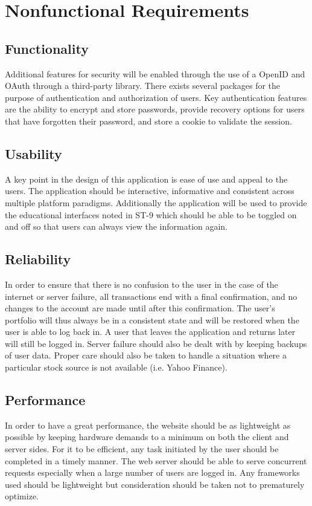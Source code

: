 \section{Nonfunctional Requirements}

\subsection{Functionality}
Additional features for security will be enabled through the use of a
OpenID and OAuth through a third-party library. There exists several packages
for the purpose of authentication and authorization of users. Key authentication
features are the ability to encrypt and store passwords, provide recovery
options for users that have forgotten their password, and store a cookie to
validate the session.


\subsection{Usability}
A key point in the design of this application is ease of use and appeal to the
users. The application should be interactive, informative and consistent across
multiple platform paradigms. Additionally the application will be used to
provide the educational interfaces noted in ST-9 which should be able to be
toggled on and off so that users can always view the information again.


\subsection{Reliability}
In order to ensure that there is no confusion to the user in the case of the
internet or server failure, all transactions end with a final confirmation, and
no changes to the account are made until after this confirmation. The user's
portfolio will thus always be in a consistent state and will be restored when
the user is able to log back in. A user that leaves the application and returns
later will still be logged in. Server failure should also be dealt with by
keeping backups of user data.  Proper care should also be taken to handle a
situation where a particular stock source is not available (i.e. Yahoo Finance).


\subsection{Performance}
In order to have a great performance, the website should be as lightweight as
possible by keeping hardware demands to a minimum on both the client and server
sides. For it to be efficient, any task initiated by the user should be
completed in a timely manner. The web server should be able to serve concurrent
requests especially when a large number of users are logged in. Any frameworks
used should be lightweight but consideration should be taken not to prematurely
optimize.



